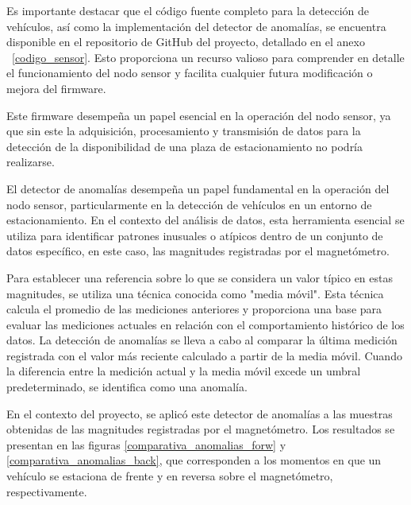 Es importante destacar que el código fuente completo para la detección de vehículos, así como la implementación del detector de anomalías, se encuentra disponible en el repositorio de GitHub del proyecto, detallado en el anexo ~\ref{codigo_sensor}. Esto proporciona un recurso valioso para comprender en detalle el funcionamiento del nodo sensor y facilita cualquier futura modificación o mejora del firmware.

Este firmware desempeña un papel esencial en la operación del nodo sensor, ya que sin este la adquisición, procesamiento y transmisión de datos para la detección de la disponibilidad de una plaza de estacionamiento no podría realizarse.


\label{detector_anomalias}
El detector de anomalías desempeña un papel fundamental en la operación del nodo sensor, particularmente en la detección de vehículos en un entorno de estacionamiento. En el contexto del análisis de datos, esta herramienta esencial se utiliza para identificar patrones inusuales o atípicos dentro de un conjunto de datos específico, en este caso, las magnitudes registradas por el magnetómetro.

Para establecer una referencia sobre lo que se considera un valor típico en estas magnitudes, se utiliza una técnica conocida como "media móvil". Esta técnica calcula el promedio de las mediciones anteriores y proporciona una base para evaluar las mediciones actuales en relación con el comportamiento histórico de los datos. La detección de anomalías se lleva a cabo al comparar la última medición registrada con el valor más reciente calculado a partir de la media móvil. Cuando la diferencia entre la medición actual y la media móvil excede un umbral predeterminado, se identifica como una anomalía.

En el contexto del proyecto, se aplicó este detector de anomalías a las muestras obtenidas de las magnitudes registradas por el magnetómetro. Los resultados se presentan en las figuras \ref{comparativa_anomalias_forw} y \ref{comparativa_anomalias_back}, que corresponden a los momentos en que un vehículo se estaciona de frente y en reversa sobre el magnetómetro, respectivamente.


